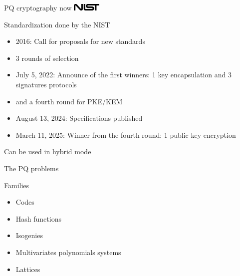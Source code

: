 \documentclass{beamer}
\begin{document}
\begin{frame}{PQ cryptography now}
		\includegraphics[width=0.1\textwidth]{NIST_logo.pdf}
		\centering
	\begin{block}{Standardization done by the NIST}
		\begin{itemize}
			\item 2016: Call for proposals for new standards
			\item 3 rounds of selection
			\item July 5, 2022: Announce of the first winners: 1 key encapsulation and 3 signatures protocols
			\item and a fourth round for PKE/KEM
			\item August 13, 2024: Specifications published
			\item March 11, 2025: Winner from the fourth round: 1 public key encryption
		\end{itemize}
	\end{block}

	Can be used in hybrid mode

\end{frame}

\begin{frame}{The PQ problems}
	\begin{block}{Families}
		\begin{itemize}
			\item Codes
			\item Hash functions %
			\item Isogenies
			\item Multivariates polynomials systems
			\item { Lattices}
		\end{itemize}
	\end{block}
\end{frame}
\end{document}
